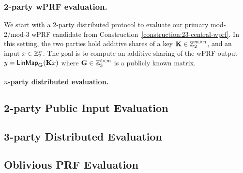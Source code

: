 \subsubsection{2-party wPRF evaluation.}
We start with a 2-party distributed protocol to evaluate our primary mod-2/mod-3 wPRF candidate from Construction~\ref{construction:23-central-wprf}. In this setting, the two parties hold additive shares of a key $\mat{K} \in \Z_2^{m \times n}$, and an input $x \in \mathbb{Z}_2^n$. The goal is to compute an additive sharing of the wPRF output $y = \LinMap_\mat{G}(\mat{K}x)$ where $\mat{G} \in \Z_3^{t \times m}$ is a publicly known matrix. 



\paragraph{$n$-party distributed evaluation.}

\subsection{2-party Public Input Evaluation}

\subsection{3-party Distributed Evaluation}

\subsection{Oblivious PRF Evaluation}
